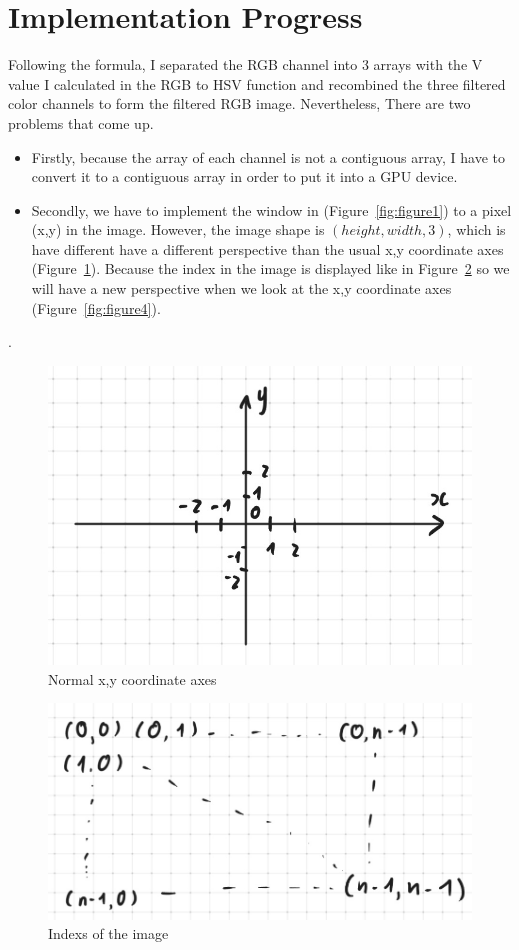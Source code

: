 \documentclass{article}
\begin{document}
\section{Implementation Progress}
Following the formula, I separated the RGB channel into 3 arrays with the V value I calculated in the RGB to HSV function and recombined the three filtered color channels to form the filtered RGB image. Nevertheless, There are two problems that come up.
\begin{itemize}
  \item Firstly, because the array of each channel is not a contiguous array, I have to convert it to a contiguous array in order to put it into a GPU device.
  \item Secondly, we have to implement the window in (Figure~\ref{fig:figure1}) to a pixel (x,y) in the image. However, the image shape is $(height, width, 3)$, which is have different have a different perspective than the usual x,y coordinate axes (Figure~\ref{fig:figure2}). Because the index in the image is displayed like in Figure~\ref{fig:figure3} so we will have a new perspective when we look at the x,y coordinate axes (Figure~\ref{fig:figure4}).
\end{itemize}. 

\begin{figure}
    \centering
    \includegraphics[scale=0.5]{images/normalXY.jpg}
    \caption{Normal x,y coordinate axes}
    \label{fig:figure2}
\end{figure}

\begin{figure}
    \centering
    \includegraphics[scale=0.5]{images/imgShape.jpg}
    \caption{Indexs of the image}
    \label{fig:figure3}
\end{figure}
\end{document}
